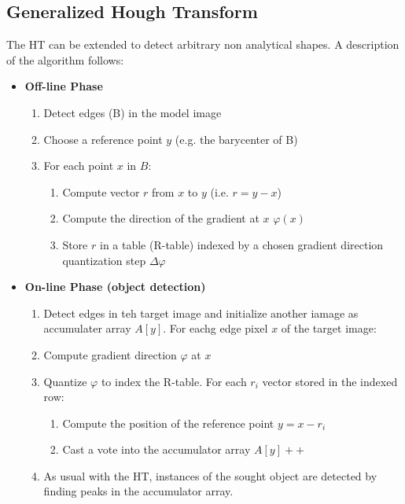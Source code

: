 \documentclass{article}
\begin{document}
\subsection{Generalized Hough Transform}
The HT can be extended to detect arbitrary non analytical shapes. A description of the algorithm follows:
\begin{itemize}
    \item \textbf{Off-line Phase}
        \begin{enumerate}
            \item Detect edges (B) in the model image
            \item Choose a reference point $y$ (e.g. the barycenter of B) 
            \item For each point $x$ in $B$:
                \begin{enumerate}
                    \item Compute vector $r$ from $x$ to $y$ (i.e. $r=y-x$) 
                    \item Compute the direction of the gradient at $x$ $\varphi(x)$ 
                    \item Store $r$ in a table (R-table) indexed by a chosen gradient direction quantization step $\Delta\varphi$
                \end{enumerate}
        \end{enumerate} 
    \item \textbf{On-line Phase (object detection)} 
    \begin{enumerate}
        \item Detect edges in teh target image and initialize another iamage as accumulater array $A[y]$. For eachg edge pixel $x$ of the target image:
        \item Compute gradient direction $\varphi$ at $x$ 
        \item Quantize $\varphi$ to index the R-table. For each $r_i$ vector stored in the indexed row:
            \begin{enumerate}
                \item Compute the position of the reference point $y=x-r_i$ 
                \item Cast a vote into the accumulator array $A[y]++$ 
            \end{enumerate}
        \item As usual with the HT, instances of the sought object are detected by finding peaks in the accumulator array.
    \end{enumerate}
\end{itemize}
\end{document}
